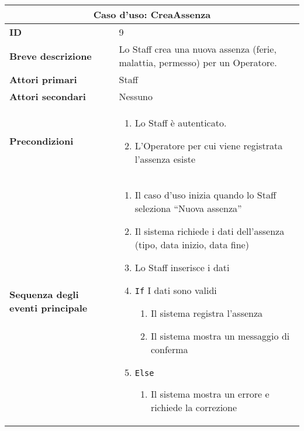 \documentclass[a4paper]{report}
\begin{document}
\clearpage
\renewcommand{\arraystretch}{1.9}
\begin{table}[H]
\vspace*{-0cm}
\begin{tabular}{|p{3.9cm}|p{9.9cm}|}
\hline
\multicolumn{2}{|c|}{\textbf{Caso d’uso: CreaAssenza}} \\ \hline
\textbf{ID} & 9 \\ \hline
\textbf{Breve descrizione} & Lo Staff crea una nuova assenza (ferie, malattia, permesso) per un Operatore. \\ \hline
\textbf{Attori primari} & Staff \\ \hline
\textbf{Attori secondari} & Nessuno \\ \hline
\textbf{Precondizioni} & \begin{enumerate}[leftmargin=14pt,label=\arabic*.,labelsep=0.5em,topsep=0pt,partopsep=0pt,parsep=0pt,itemsep=0pt]
    \item Lo Staff è autenticato.
    \item L’Operatore per cui viene registrata l’assenza esiste
\end{enumerate} \\ \hline
\textbf{Sequenza degli eventi principale} & \begin{enumerate}[leftmargin=14pt,label=\arabic*.,labelsep=0.5em,topsep=0pt,partopsep=0pt,parsep=0pt,itemsep=0pt]
    \item Il caso d’uso inizia quando lo Staff seleziona “Nuova assenza”
    \item Il sistema richiede i dati dell’assenza (tipo, data inizio, data fine)
    \item Lo Staff inserisce i dati
    \item \texttt{If} I dati sono validi
    \begin{enumerate}[label=\arabic{enumi}.\arabic*.,leftmargin=22pt,labelsep=0.5em,topsep=0pt,partopsep=0pt,parsep=0pt,itemsep=0pt]
        \item Il sistema registra l’assenza
        \item Il sistema mostra un messaggio di conferma
    \end{enumerate}
    \item \texttt{Else}
    \begin{enumerate}[label=\arabic{enumi}.\arabic*.,leftmargin=22pt,labelsep=0.5em,topsep=0pt,partopsep=0pt,parsep=0pt,itemsep=0pt]
        \item Il sistema mostra un errore e richiede la correzione
    \end{enumerate}

\end{enumerate}
\end{tabular}
\end{table}
\end{document}
